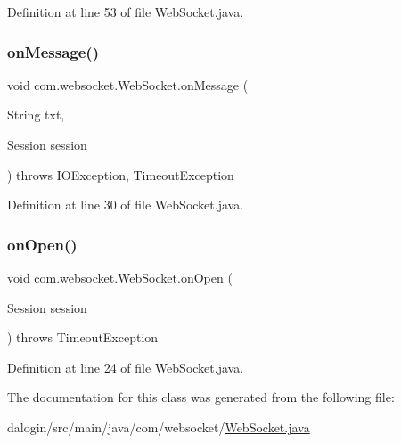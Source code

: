 Definition at line 53 of file Web\+Socket.\+java.

\mbox{\label{classcom_1_1websocket_1_1_web_socket_a812f5478e1288107eccba2df377f15a9}} 
\subsubsection{\texorpdfstring{on\+Message()}{onMessage()}}
{\footnotesize\ttfamily void com.\+websocket.\+Web\+Socket.\+on\+Message (\begin{DoxyParamCaption}\item[{String}]{txt,  }\item[{Session}]{session }\end{DoxyParamCaption}) throws I\+O\+Exception, Timeout\+Exception}



Definition at line 30 of file Web\+Socket.\+java.

\mbox{\label{classcom_1_1websocket_1_1_web_socket_a09fb5688d7e3bdc311b8db081a03cb3c}} 
\subsubsection{\texorpdfstring{on\+Open()}{onOpen()}}
{\footnotesize\ttfamily void com.\+websocket.\+Web\+Socket.\+on\+Open (\begin{DoxyParamCaption}\item[{Session}]{session }\end{DoxyParamCaption}) throws Timeout\+Exception}



Definition at line 24 of file Web\+Socket.\+java.



The documentation for this class was generated from the following file\+:\begin{DoxyCompactItemize}
\item 
dalogin/src/main/java/com/websocket/\hyperlink{_web_socket_8java}{Web\+Socket.\+java}\end{DoxyCompactItemize}

